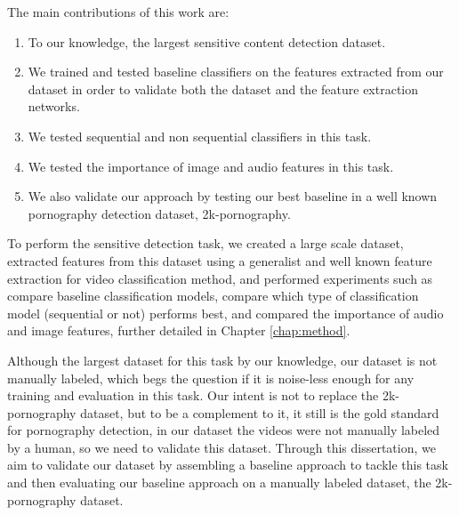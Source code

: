 The main contributions of this work are:
\begin{enumerate}
    \item To our knowledge, the largest sensitive content detection dataset.
    \item We trained and tested baseline classifiers on the features extracted from our dataset in order to validate both the dataset and the feature extraction networks.  
    \item We tested sequential and non sequential classifiers in this task.
    \item We tested the importance of image and audio features in this task.
    \item We also validate our approach by testing our best baseline in a well known pornography detection dataset, 2k-pornography. 
\end{enumerate}

To perform the sensitive detection task, we created a large scale dataset, extracted features from this dataset using a generalist and well known feature extraction for video classification method, and performed experiments such as compare baseline classification models, compare which type of classification model (sequential or not) performs best, and compared the importance of audio and image features, further detailed in Chapter \ref{chap:method}.

Although the largest dataset for this task by our knowledge, our dataset is not manually labeled, which begs the question if it is noise-less enough for any training and evaluation in this task.  
Our intent is not to replace the 2k-pornography dataset, but to be a complement to it, it still is the gold standard for pornography detection, in our dataset the videos were not manually labeled by a human, so we need to validate this dataset. Through this dissertation, we aim to validate our dataset by assembling a baseline approach to tackle this task and then evaluating our baseline approach on a manually labeled dataset, the 2k-pornography dataset.

